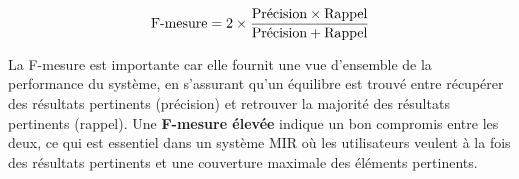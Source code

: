 \begin{section}
 \[
   \text{F-mesure} = 2 \times \frac{\text{Précision}\times\text{Rappel}}{\text{Précision}+\text{Rappel}}
   \vspace{1cm}
 \]

 La F-mesure est importante car elle fournit une vue d'ensemble de la
 performance du système, en s'assurant qu'un équilibre est trouvé entre
 récupérer des résultats pertinents (précision) et retrouver la majorité des
 résultats pertinents (rappel). Une \textbf{F-mesure élevée} indique un bon compromis
 entre les deux, ce qui est essentiel dans un système MIR où les utilisateurs
 veulent à la fois des résultats pertinents et une couverture maximale des
 éléments pertinents.

 \vfill
\end{section}
